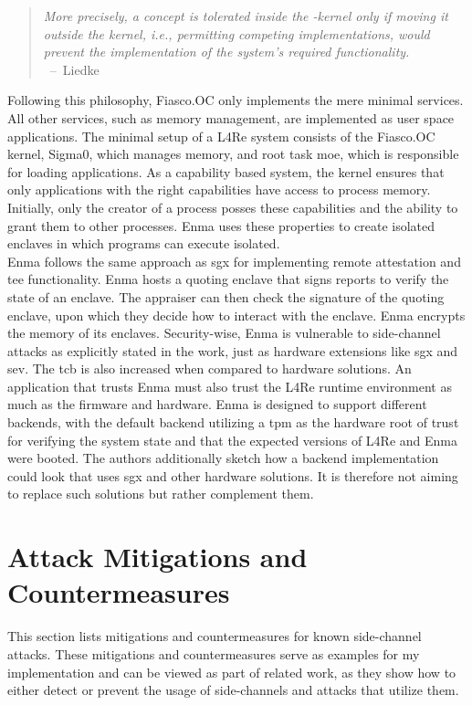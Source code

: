 \begin{quote}
  \textit{ More precisely, a concept is tolerated inside the \mu-kernel only
    if moving it outside the kernel, i.e., permitting competing
    implementations, would prevent the implementation of the system's
    required functionality. \\
  } \mbox{ -- Liedke~\cite{liedtke1995micro}}
\end{quote}

Following this philosophy, Fiasco.OC only implements the mere minimal services.
All other services, such as memory management, are implemented as user space
applications. The minimal setup of a L4Re system consists of the Fiasco.OC
kernel, Sigma0, which manages memory, and root task moe, which is responsible
for loading applications. As a capability based system, the kernel ensures that
only applications with the right capabilities have access to process memory.
Initially, only the creator of a process posses these capabilities and the
ability to grant them to other processes. Enma uses these properties to create
isolated enclaves in which programs can execute isolated.\\

Enma follows the same approach as \gls{sgx} for implementing remote attestation
and \gls{tee} functionality. Enma hosts a quoting enclave that signs reports to
verify the state of an enclave. The appraiser can then check the signature of
the quoting enclave, upon which they decide how to interact with the enclave.
Enma encrypts the memory of its enclaves. Security-wise, Enma is vulnerable to
side-channel attacks as explicitly stated in the work, just as hardware
extensions like \gls{sgx} and \gls{sev}. The \gls{tcb} is also increased when
compared to hardware solutions. An application that trusts Enma must also trust
the L4Re runtime environment as much as the firmware and hardware. Enma is
designed to support different backends, with the default backend utilizing a
\gls{tpm} as the hardware root of trust for verifying the system state and that
the expected versions of L4Re and Enma were booted. The authors additionally
sketch how a backend implementation could look that uses \gls{sgx} and other
hardware solutions. It is therefore not aiming to replace such solutions but
rather complement them.

\section{Attack Mitigations and Countermeasures}
\label{sec:20:mitigations}
This section lists mitigations and countermeasures for known side-channel
attacks. These mitigations and countermeasures serve as examples for my
implementation and can be viewed as part of related work, as they show how to
either detect or prevent the usage of side-channels and attacks that utilize
them.

